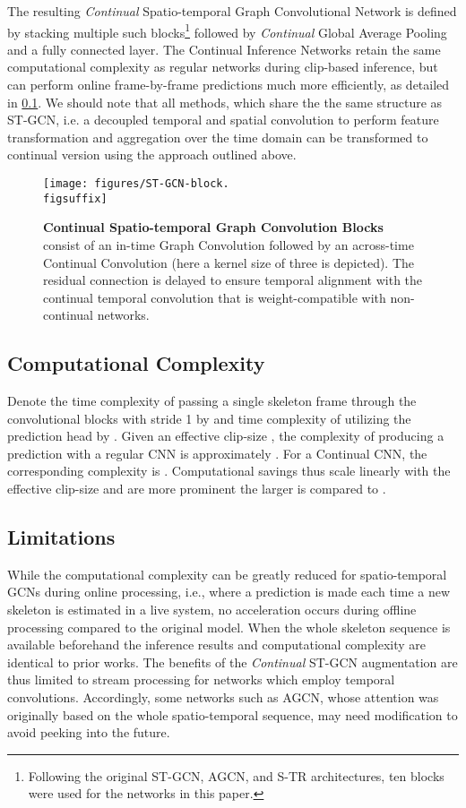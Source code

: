 \documentclass[journal]{IEEEtran}
\newcommand{\figsuffix}{png}
\theoremstyle{definition}
\begin{document}
The resulting \textit{Continual} Spatio-temporal Graph Convolutional Network is defined by stacking multiple such blocks\footnote{Following the original ST-GCN, AGCN, and S-TR architectures, ten blocks were used for the networks in this paper.} followed by \textit{Continual} Global Average Pooling~\cite{hedegaard2021continual} and a fully connected layer.
The Continual Inference Networks retain the same computational complexity as regular networks during clip-based inference, but can perform online frame-by-frame predictions much more efficiently, as detailed in \cref{sec:complexity}.
We should note that all methods, which share the the same structure as ST-GCN, i.e. a decoupled temporal and spatial convolution to perform feature transformation and aggregation over the time domain can be transformed to continual version using the approach outlined above.

\begin{figure}[tb]
    \centering
    \texttt{[image: figures/ST-GCN-block.\\figsuffix]}
    \caption{\textbf{Continual Spatio-temporal Graph Convolution Blocks} consist of an in-time Graph Convolution followed by an across-time Continual Convolution (here a kernel size of three is depicted). The residual connection is delayed to ensure temporal alignment with the continual temporal convolution that is weight-compatible with non-continual networks. }
    \label{fig:co-st-gcn-block}
\end{figure}

\subsection{Computational Complexity} \label{sec:complexity}
Denote the time complexity of passing a single skeleton frame through the convolutional blocks with stride 1 by  and time complexity of utilizing the prediction head by .
Given an effective clip-size , the complexity of producing a prediction with a regular CNN is approximately .
For a Continual CNN, the corresponding complexity is . 
Computational savings thus scale linearly with the effective clip-size  and are more prominent the larger  is compared to .


\subsection{Limitations}
{
While the computational complexity can be greatly reduced for spatio-temporal GCNs during online processing, i.e., where a prediction is made each time a new skeleton is estimated in a live system, no acceleration occurs during offline processing compared to the original model. When the whole skeleton sequence is available beforehand the inference results and computational complexity are identical to prior works. The benefits of the \textit{Continual} ST-GCN augmentation are thus limited to stream processing for networks which employ temporal convolutions. Accordingly, some networks such as AGCN, whose attention was originally based on the whole spatio-temporal sequence, may need modification to avoid peeking into the future.}
\end{document}
